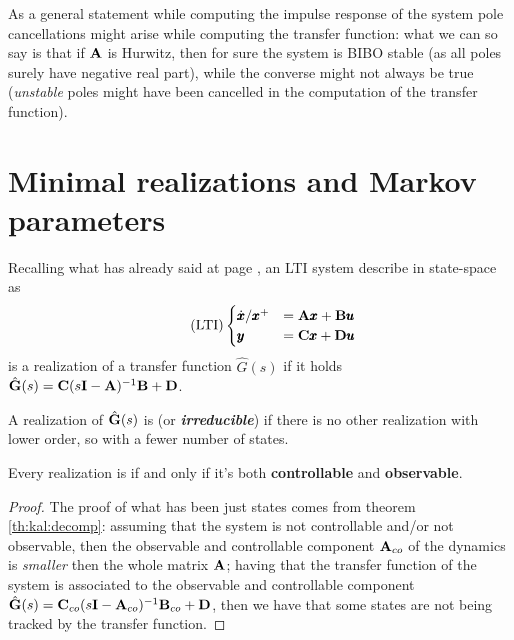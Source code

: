 	As a general statement while computing the impulse response of the system pole cancellations might arise while computing the transfer function: what we can so say is that if $\mathbf{A}$ is Hurwitz, then for sure the system is BIBO stable (as all poles surely have negative real part), while the converse might not always be true (\textit{unstable} poles might have been cancelled in the computation of the transfer function).

\section{Minimal realizations and Markov parameters}
	Recalling what has already said at page \pageref{sec:dyn:realizations}, an LTI system describe in state-space as
	\[ \tag{LTI} \begin{cases}
		\dot{\pmb{x}}/\pmb{x}^+ & = \mathbf{A}\pmb{x} + \mathbf{B}\pmb{u} \\ \pmb{y} & = \mathbf{C}\pmb{x} + \mathbf{D} \pmb{u}
	\end{cases} \]
	is a realization of a transfer function $\hat G(s)$ if it holds $\hat {\mathbf{G}}(s) = \mathbf{C}(s\mathbf{I}-\mathbf{A})^{-1}\mathbf{B} + \mathbf{D}$.
	\begin{theorem}
		A realization of $\hat {\mathbf{G}}(s)$ is  (or \textbf{\textit{irreducible}}) if there is no other realization with lower order, so with a fewer number of states.
	\end{theorem}
	\begin{theorem} \label{th:kal:temp3}
		Every realization is  if and only if it's both \textbf{controllable} and \textbf{observable}.
	\end{theorem}
	\begin{proof}
		The proof of what has been just states comes from theorem \ref{th:kal:decomp}: assuming that the system is not controllable and/or not observable, then the observable and controllable component $\mathbf{A}_{co}$ of the dynamics is \textit{smaller} then the whole  matrix $\mathbf{A}$; having that the transfer function of the system is associated to the observable and controllable component $\hat {\mathbf{G}}(s) = \mathbf{C}_{co}(s\mathbf{I}-\mathbf{A}_{co})^{-1}\mathbf{B}_{co} + \mathbf{D}$, then we have that some states are not being tracked by the transfer function.
	\end{proof}
	
